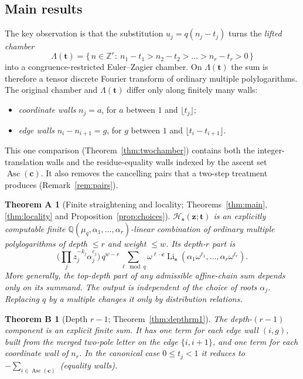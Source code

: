 \documentclass[11pt]{amsart}
\newtheorem*{theoremA}{Theorem A}
\newtheorem*{theoremB}{Theorem B}
\theoremstyle{definition}
\theoremstyle{remark}
\numberwithin{equation}{section}
\newcommand{\Z}{\mathbb{Z}}
\newcommand{\Q}{\mathbb{Q}}
\newcommand{\Li}{\operatorname{Li}}
\newcommand{\Asc}{\operatorname{Asc}}
\newcommand{\s}{\mathbf{s}}
\newcommand{\z}{\mathbf{z}}
\newcommand{\tb}{\mathbf{t}}
\newcommand{\cb}{\mathbf{c}}
\newcommand{\lb}{\boldsymbol{\ell}}
\newcommand{\Hs}{\mathcal{H}}
\newcommand{\lfl}{\lfloor}
\newcommand{\rfl}{\rfloor}
\begin{document}
\subsection*{Main results}
The key observation is that the substitution $u_j=q(n_j-t_j)$ turns the \emph{lifted chamber}
\[
\Lambda(\tb)=\{\,n\in\Z^r:\ n_1-t_1>n_2-t_2>\dots>n_r-t_r>0\,\}
\]
into a congruence-restricted Euler--Zagier chamber. On $\Lambda(\tb)$ the sum is therefore a tensor discrete Fourier transform of ordinary multiple polylogarithms. The original chamber and $\Lambda(\tb)$ differ only along finitely many walls:
\begin{itemize}[leftmargin=1.5em]
\item \emph{coordinate walls} $n_j=a$, for $a$ between $1$ and $\lfl t_j\rfl$;
\item \emph{edge walls} $n_i-n_{i+1}=g$, for $g$ between $1$ and $\lfl t_i-t_{i+1}\rfl$.
\end{itemize}
This one comparison (Theorem~\ref{thm:twochamber}) contains both the integer-translation walls and the residue-equality walls indexed by the ascent set $\Asc(\cb)$. It also removes the cancelling pairs that a two-step treatment produces (Remark~\ref{rem:pairs}).

\begin{theoremA}[Finite straightening and locality; Theorems~\ref{thm:main}, \ref{thm:locality} and Proposition~\ref{prop:choices}]
$\Hs_\s(\z;\tb)$ is an explicitly computable finite $\Q(\mu_q,\alpha_1,\dots,\alpha_r)$-linear combination of ordinary multiple polylogarithms of depth $\le r$ and weight $\le w$. Its depth-$r$ part is
\[
\Big(\prod_j z_j^{-k_j}\alpha_j^{c_j}\Big)\,q^{w-r}\sum_{\lb\bmod q}\omega^{\lb\cdot\cb}\Li_\s(\alpha_1\omega^{\ell_1},\dots,\alpha_r\omega^{\ell_r}).
\]
More generally, the top-depth part of any admissible affine-chain sum depends only on its summand. The output is independent of the choice of roots $\alpha_j$. Replacing $q$ by a multiple changes it only by distribution relations.
\end{theoremA}

\begin{theoremB}[Depth $r-1$; Theorem~\ref{thm:depthrm1}]
The depth-$(r-1)$ component is an explicit finite sum. It has one term for each edge wall $(i,g)$, built from the merged two-pole letter on the edge $\{i,i+1\}$, and one term for each coordinate wall of $n_r$. In the canonical case $0\le t_j<1$ it reduces to $-\sum_{i\in\Asc(\cb)}$ (equality walls).
\end{theoremB}
\end{document}
